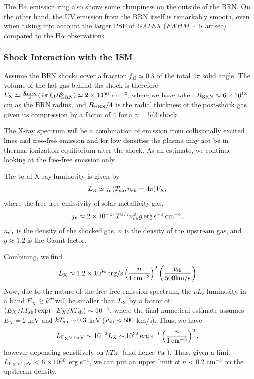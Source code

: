 \documentclass[]{aastex631}
\newcommand{\be}{\begin{equation}}
\newcommand{\ee}{\end{equation}}
\begin{document}
The H$\alpha$ emission ring also shows some clumpiness on the outside of the BRN. On the other hand, the UV emission from the BRN itself is remarkably smooth, even when taking into account the larger PSF of \emph{GALEX} ($FWHM \sim 5$~arcsec) compared to the H$\alpha$ observations.


\subsubsection{Shock Interaction with the ISM}

Assume the BRN shocks cover a fraction $f_{\Omega} \simeq 0.3$ of the total 4$\pi$ solid angle.  The volume of the hot gas behind the shock is therefore $V_{\rm X} \simeq \frac{R_{\rm BRN}}{4}(4\pi f_{\Omega} R_{\rm BRN}^{3}) \simeq 2\times 10^{56}$ cm$^{-3}$, where we have taken $R_{\rm BRN} \approx 6\times 10^{18}$ cm as the BRN radius, and $R_{\rm BRN}/4$ is the radial thickness of the post-shock gas given its compression by a factor of 4 for a $\gamma = 5/3$ shock.

The X-ray spectrum will be a combination of emission from collisionally excited lines and free-free emission and for low densities the plasma may not be in thermal ionization equilibrium after the shock. As an estimate, we continue looking at the free-free emission only.

The total X-ray luminosity is given by
\be
L_{\rm X} \simeq j_{\nu}(T_{\rm sh},n_{\rm sh} = 4 n)V_{\rm X},
\ee
where the free-free emissivity of solar-metallicity gas,
\be
j_{\nu} \approx 2\times 10^{-27}T^{1/2}n_{\rm sh}^{2}\bar{g}\,{\rm erg\,s^{-1}\,cm^{-3}},
\ee
$n_{\rm sh}$ is the density of the shocked gas, $n$ is the density of the upstream gas, and $\bar{g} \approx 1.2$ is the Gaunt factor.

Combining, we find
\be
L_{\rm X} \approx 1.2\times 10^{34}\,{\rm erg/s}\left(\frac{n}{1\,{\rm cm^{-3}}}\right)^{2}\left(\frac{v_{\rm sh}}{500{\rm km/s}}\right)
\ee
Now, due to the nature of the free-free emission spectrum, the $\nu L_{\nu}$ luminosity in a band $E_X \gtrsim kT$ will be smaller than $L_{\rm X}$ by a factor of $(E_X/kT_{\rm sh})\exp(-E_X/kT_{\rm sh}) \sim 10^{-2}$, where the final numerical estimate assumes $E_X = 2$ keV and $kT_{\rm sh} \sim 0.3$ keV ($v_{\rm sh} \approx 500$ km/s).  Thus, we have
\be
L_{\rm E_X > 1 keV} \sim 10^{-2}L_{\rm X} \sim 10^{32}\,{\rm erg\,s^{-1}}\left(\frac{n}{1\,{\rm cm^{-3}}}\right)^{2},
\ee
however depending sensitively on $kT_{\rm sh}$ (and hence $v_{\rm sh}$).  Thus, given a limit $L_{\rm E_X > 1 keV}  < 6\times 10^{30}$ erg s$^{-1}$, we can put an upper limit of $n < 0.2$ cm$^{-3}$ on the upstream density.
\end{document}
